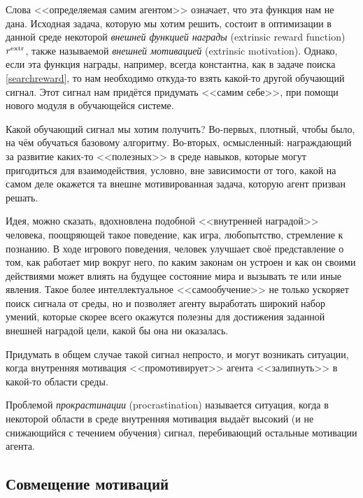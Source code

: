 Слова <<определяемая самим агентом>> означает, что эта функция нам не дана. Исходная задача, которую мы хотим решить, состоит в оптимизации в данной среде некоторой \emph{внешней функцией награды} (extrinsic reward function) $r^{\mathrm{extr}}$, также называемой \emph{внешней мотивацией} (extrinsic motivation). Однако, если эта функция награды, например, всегда константна, как в задаче поиска \eqref{searchreward}, то нам необходимо откуда-то взять какой-то другой обучающий сигнал. Этот сигнал нам придётся придумать <<самим себе>>, при помощи нового модуля в обучающейся системе.

Какой обучающий сигнал мы хотим получить? Во-первых, плотный, чтобы было, на чём обучаться базовому алгоритму. Во-вторых, осмысленный: награждающий за развитие каких-то <<полезных>> в среде навыков, которые могут пригодиться для взаимодействия, условно, вне зависимости от того, какой на самом деле окажется та внешне мотивированная задача, которую агент призван решать.

\begin{example}
Идея, можно сказать, вдохновлена подобной <<внутренней наградой>> человека, поощряющей такое поведение, как игра, любопытство, стремление к познанию. В ходе игрового поведения, человек улучшает своё представление о том, как работает мир вокруг него, по каким законам он устроен и как он своими действиями может влиять на будущее состояние мира и вызывать те или иные явления. Такое более интеллектуальное <<самообучение>> не только ускоряет поиск сигнала от среды, но и позволяет агенту выработать широкий набор умений, которые скорее всего окажутся полезны для достижения заданной внешней наградой цели, какой бы она ни оказалась.
\end{example}

Придумать в общем случае такой сигнал непросто, и могут возникать ситуации, когда внутренняя мотивация <<промотивирует>> агента <<залипнуть>> в какой-то области среды.

\begin{definition}
Проблемой \emph{прокрастинации} (procrastination) называется ситуация, когда в некоторой области в среде внутренняя мотивация выдаёт высокий (и не снижающийся с течением обучения) сигнал, перебивающий остальные мотивации агента.
\end{definition}

\subsection{Совмещение мотиваций}

